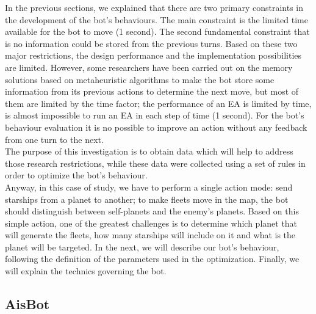 \documentclass[conference]{IEEEtran}
\begin{document}
In the previous sections, we explained that there are two primary constraints in the development of the bot's behaviours. The main constraint is the limited time available for the bot to move (1 second). The second fundamental constraint that is no information could be stored from the previous turns. Based on these two major restrictions, the design performance and the implementation possibilities are limited. However, some researchers have been carried out on the memory solutions based on metaheuristic algorithms to make the bot store some information from its previous actions to determine the next move, but most of them are limited by the time factor; the performance of an EA is limited by time, is almost impossible to run an EA in each step of time (1 second). For the bot's behaviour evaluation it is no possible to improve an action without any feedback from one turn to the next. \\
The purpose of this investigation is to obtain data which will help to address those research restrictions, while these data were collected using a set of rules in order to optimize the bot's behaviour. \\
Anyway, in this case of study, we have to perform a single action mode: send starships from a planet to another; to make fleets move in the map, the bot should distinguish between self-planets and the enemy's planets. Based on this simple action, one of the greatest challenges is to determine which planet that will generate the fleets, how many starships will include on it and what is the planet will be targeted. In the next, we will describe our bot's behaviour, following the definition of the parameters used in the optimization. Finally, we will explain the technics governing the bot.




\subsection{AisBot}
\end{document}
